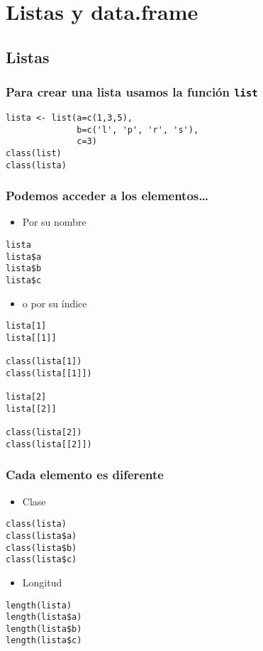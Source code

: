 \documentclass[xcolor={usenames,svgnames,dvipsnames}]{beamer}
\begin{document}
\section{Listas y data.frame}
\label{sec-4}
\subsection{Listas}
\label{sec-4-1}
\begin{frame}[fragile]
\frametitle{Para crear una lista usamos la función \texttt{list}}
\label{sec-4-1-1}


\lstset{language=R}
\begin{lstlisting}
lista <- list(a=c(1,3,5),
              b=c('l', 'p', 'r', 's'),
              c=3)
class(list)
class(lista)
\end{lstlisting}
\end{frame}
\begin{frame}[fragile]
\frametitle{Podemos acceder a los elementos\ldots{}}
\label{sec-4-1-2}

\begin{itemize}
\item Por su nombre
\end{itemize}

\lstset{language=R}
\begin{lstlisting}
lista
lista$a
lista$b
lista$c
\end{lstlisting}

\begin{itemize}
\item o por su índice
\end{itemize}

\lstset{language=R}
\begin{lstlisting}
lista[1]
lista[[1]]

class(lista[1])
class(lista[[1]])

lista[2]
lista[[2]]

class(lista[2])
class(lista[[2]])
\end{lstlisting}
\end{frame}
\begin{frame}[fragile]
\frametitle{Cada elemento es diferente}
\label{sec-4-1-3}

\begin{itemize}
\item Clase
\end{itemize}

\lstset{language=R}
\begin{lstlisting}
class(lista)
class(lista$a)
class(lista$b)
class(lista$c)
\end{lstlisting}
\begin{itemize}
\item Longitud
\end{itemize}

\lstset{language=R}
\begin{lstlisting}
length(lista)
length(lista$a)
length(lista$b)
length(lista$c)
\end{lstlisting}
\end{frame}
\end{document}
